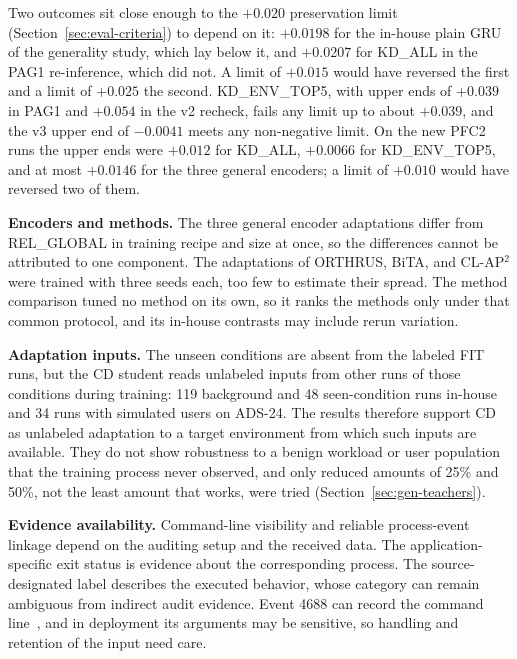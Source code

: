 Two outcomes sit close enough to the $+0.020$ preservation limit
(Section~\ref{sec:eval-criteria}) to depend on it: $+0.0198$ for
the in-house plain GRU of the generality study, which lay below it, and
$+0.0207$ for KD\_ALL in the PAG1 re-inference, which did not. A limit
of $+0.015$ would have reversed the first and a limit of $+0.025$ the
second. KD\_ENV\_TOP5, with upper ends of $+0.039$ in PAG1 and
$+0.054$ in the v2 recheck, fails any limit up to about $+0.039$, and
the v3 upper end of $-0.0041$ meets any non-negative limit. On the new
PFC2 runs the upper ends were $+0.012$ for KD\_ALL, $+0.0066$ for
KD\_ENV\_TOP5, and at most $+0.0146$ for the three general encoders; a
limit of $+0.010$ would have reversed two of them.

\textbf{Encoders and methods.}
The three general encoder adaptations differ from REL\_GLOBAL in
training recipe and size at once, so the differences cannot be
attributed to one component. The adaptations of ORTHRUS, BiTA, and
CL-AP$^{2}$ were trained with three seeds each, too few to estimate
their spread. The method comparison tuned no method on its own, so it
ranks the methods only under that common protocol, and its in-house
contrasts may include rerun variation.

\textbf{Adaptation inputs.}
The unseen conditions are absent from the labeled FIT runs, but the CD
student reads unlabeled inputs from other runs of those conditions
during training: 119 background and 48 seen-condition runs in-house
and 34 runs with simulated users on ADS-24. The results therefore
support CD as unlabeled adaptation to a target environment from which
such inputs are available. They do not show robustness to a benign
workload or user population that the training process never observed,
and only reduced amounts of 25\% and 50\%, not the least amount that
works, were tried (Section~\ref{sec:gen-teachers}).

\textbf{Evidence availability.}
Command-line visibility and reliable process-event linkage depend
on the auditing setup and the received data. The application-specific
exit status is evidence about the corresponding process. The
source-designated label describes the executed behavior, whose
category can remain ambiguous from indirect audit evidence.
Event 4688 can record the command line~\cite{ms4688}, and in
deployment its arguments may be sensitive, so handling and retention of
the input need care.

